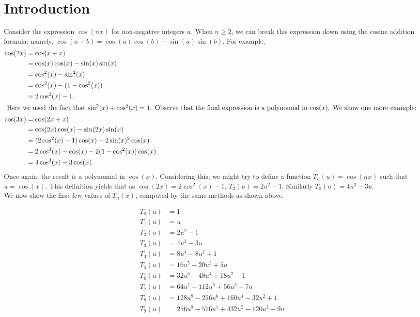 \documentclass[12pt, letterpaper]{article} %
\begin{document}
\section{Introduction}
Consider the expression $\cos (nx)$ for non-negative integers $n$. When $n \ge 2$, we can break this expression down using the cosine addition formula; namely, $\cos (a+b) = \cos(a)\cos(b) - \sin(a)\sin(b)$. For example,
\begin{align*}
\cos (2x) & = \cos (x + x) \\
 & = \cos(x) \cos(x) - \sin(x)\sin(x) \\
 & = \cos^2(x) - \sin^2(x) \\
 & = \cos^2(x) - (1 - \cos^2(x)) \\
 & = 2\cos^2(x) - 1. \\
\intertext{
Here we used the fact that $\sin^2(x) + \cos^2(x) = 1$. Observe that the final expression is a polynomial in $\cos(x)$. We show one more example:
}
\cos(3x) & = \cos(2x + x) \\
    & = \cos(2x) \cos(x) - \sin(2x)\sin(x) \\
    & = (2 \cos^2(x) - 1)\cos(x) - 2\sin(x)^2\cos(x) \\
    & = 2\cos^3(x) - \cos(x) - 2(1 - \cos^2(x))\cos(x) \\
    & = 4\cos^3(x) - 3\cos(x). \\
\end{align*}
Once again, the result is a polynomial in $\cos(x)$. Considering this, we might try to define a function $T_n(u) = \cos(nx)$ such that $u = \cos(x)$. This definition yields that as $\cos(2x) = 2\cos^2(x) - 1$, $T_2(u) = 2u^2 - 1$. Similarly $T_3(u) = 4u^3 - 3u$. \\

We now show the first few values of $T_n(x)$, computed by the same methods as shown above.

 \begin{align*}
  T_0(u) & = 1                                      \\
  T_1(u) & = u                                      \\
  T_2(u) & = 2u^2 - 1                               \\
  T_3(u) & = 4u^3 - 3u                              \\
  T_4(u) & = 8u^4 - 8 u^2 + 1                       \\
  T_5(u) & = 16u^5 - 20u^3 + 5u                     \\
  T_6(u) & = 32u^6 - 48u^4 + 18u^2 - 1              \\
  T_7(u) & = 64u^7 - 112u^5 + 56u^3 - 7u            \\
  T_8(u) & = 128u^8 - 256u^6 + 160u^4 - 32u^2 + 1   \\
  T_9(u) & = 256u^9 - 576u^7 + 432u^5 - 120u^3 + 9u
 \end{align*}
\end{document}
